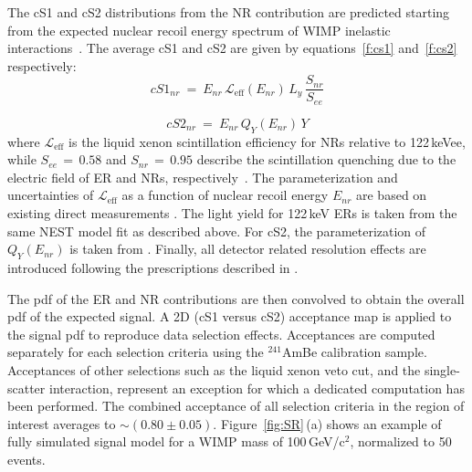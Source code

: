 The cS1 and cS2 distributions from the NR contribution are predicted starting from the expected nuclear recoil energy spectrum
of WIMP inelastic interactions~\cite{Baudis:2013bba}. The average cS1 and cS2 are given by equations~\ref{f:cs1} and~\ref{f:cs2} respectively:
\begin{equation}
cS1_{nr} ~=~ E_{nr} \, \mathcal{L}_{\text{eff}}(E_{nr}) \, L_{y} \, \frac{S_{nr}}{S_{ee}}
\label{f:cs1}
\end{equation}

\begin{equation}
cS2_{nr}  ~ = ~ E_{nr} \, Q_{Y}(E_{nr}) \, Y
\label{f:cs2}
\end{equation}
where $\mathcal{L}_{\text{eff}}$ is the liquid xenon scintillation efficiency for NRs relative to 122\,keVee, while $S_{ee} \, = \, 0.58$  and $S_{nr} \, = \, 0.95$ describe the scintillation 
quenching due to the electric field of ER and NRs, respectively~\cite{ScintQuenching}. The parameterization and uncertainties of $\mathcal{L}_{\text{eff}}$ as a function of nuclear
recoil energy $E_{nr}$ are based on existing direct measurements \cite{run8Result}. The light yield for 122\,keV ERs is taken from the same NEST model fit as described above. For cS2, the parameterization 
of $Q_{Y}(E_{nr})$ is taken from \cite{QY}. Finally, all detector related resolution effects are introduced following the prescriptions described in \cite{Aprile:2012vw}.


The pdf of the ER and NR contributions are then convolved  to obtain the overall pdf of the expected signal.
A 2D (cS1 versus cS2) acceptance map is applied to the signal pdf to reproduce data selection effects. Acceptances are computed separately for each selection 
criteria using the $^{241}$AmBe calibration sample. Acceptances of other selections such as the liquid xenon veto cut, and the single-scatter interaction, represent an exception  for which  
a dedicated computation has been performed. The combined acceptance  of all selection criteria in the region of interest averages to $\sim$$(0.80\pm0.05)$. 
Figure~\ref{fig:SR}\,(a) shows an example of fully simulated signal model for a WIMP mass of 100\,GeV/c$^2$, normalized to 50 events. 

 



